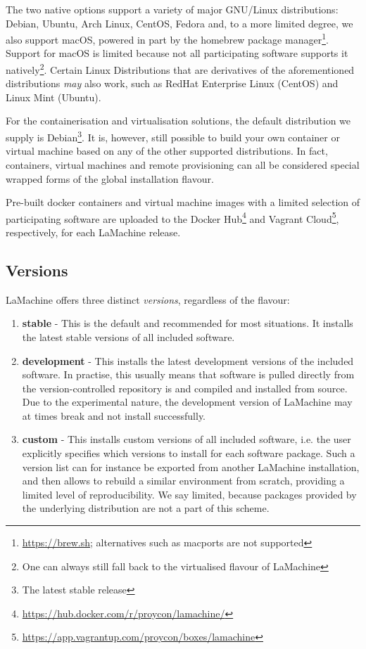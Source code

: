 \documentclass[a4paper,11pt]{article}
\begin{document}
The two native options support a variety of major GNU/Linux distributions: Debian, Ubuntu, Arch Linux, CentOS, Fedora
and, to a more limited degree, we also support macOS, powered in part by the homebrew package
manager\footnote{\url{https://brew.sh}; alternatives such as macports are not supported}. Support for macOS is limited because not all participating
software supports it natively\footnote{One can always still fall back to the virtualised flavour of LaMachine}. Certain Linux Distributions that are derivatives of the aforementioned distributions \emph{may} also work, such as RedHat
Enterprise Linux (CentOS) and Linux Mint (Ubuntu).

For the containerisation and virtualisation solutions, the default distribution we supply is Debian\footnote{The latest
stable release}. It is, however, still possible to build your own container or virtual machine based on any of the other supported
distributions. In fact, containers, virtual machines and remote provisioning can all be considered special wrapped forms of
the global installation flavour.

Pre-built docker containers and virtual machine images with a limited selection of participating software are uploaded
to the Docker Hub\footnote{\url{https://hub.docker.com/r/proycon/lamachine/}} and Vagrant
Cloud\footnote{\url{https://app.vagrantup.com/proycon/boxes/lamachine}}, respectively, for each LaMachine release.

\subsection{Versions}

LaMachine offers three distinct \emph{versions}, regardless of the flavour:

\begin{enumerate}
    \item \textbf{stable} - This is the default and recommended for most situations. It installs the latest stable
        versions of all included software.
    \item \textbf{development} - This installs the latest development versions of the included software. In practise,
        this usually means that software is pulled directly from the version-controlled repository is and compiled and installed from source. Due to the experimental nature, the development version of
        LaMachine may at times break and not install successfully.
    \item \textbf{custom} - This installs custom versions of all included software, i.e. the user explicitly
        specifies which versions to install for each software package.  Such a version list can for instance be exported
        from another LaMachine installation, and then allows to rebuild a similar environment from scratch, providing a
        limited level of reproducibility. We say limited, because packages
        provided by the underlying distribution are not a part of this scheme.
\end{enumerate}
\end{document}
